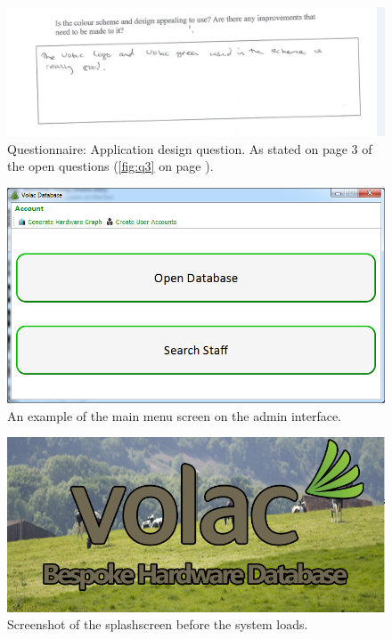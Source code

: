 \begin{figure}[H]
    \includegraphics[width=\textwidth]{./Evaluation/EvaluationQuestionnaire/designq.png}
    \caption{Questionnaire: Application design question. As stated on page 3 of the open questions (\ref{fig:q3} on page \pageref{fig:q3}).} 
\end{figure}


\begin{figure}[H]
    \includegraphics[width=\textwidth]{./Manual/Images/graph.png}
    \caption{An example of the main menu screen on the admin interface.} 
\end{figure}

\begin{figure}[H]
    \includegraphics[width=\textwidth]{./Evaluation/Images/splashscreen.png}
 \caption{Screenshot of the splashscreen before the system loads.} 
\end{figure}

